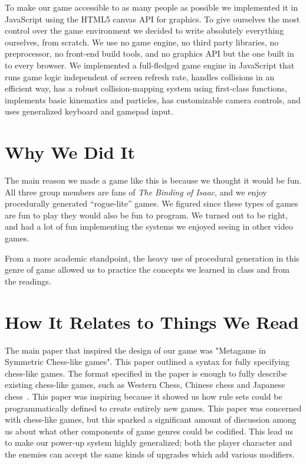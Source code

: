 \documentclass[a4paper, 12pt]{article}
\begin{document}
To make our game accessible to as many people as possible we implemented it in
JavaScript using the HTML5 canvas API for graphics. To give ourselves the most
control over the game environment we decided to write absolutely everything
ourselves, from scratch. We use no game engine, no third party libraries, no
preprocessor, no front-end build tools, and no graphics API but the one built in
to every browser. We implemented a full-fledged game engine in JavaScript that
runs game logic independent of screen refresh rate, handles collisions in an
efficient way, has a robust collision-mapping system using first-class
functions, implements basic kinematics and particles, has customizable camera
controls, and uses generalized keyboard and gamepad input.

\section{Why We Did It}

The main reason we made a game like this is because we thought it would be fun.
All three group members are fans of \textit{The Binding of Isaac}, and we enjoy
procedurally generated ``rogue-lite'' games. We figured since these types of
games are fun to play they would also be fun to program. We turned out to be
right, and had a lot of fun implementing the systems we enjoyed seeing in other
video games.

From a more academic standpoint, the heavy use of procedural generation in this
genre of game allowed us to practice the concepts we learned in class and from
the readings.

\section{How It Relates to Things We Read}

The main paper that inspired the design of our game was "Metagame in Symmetric
Chess-like games". This paper outlined a syntax for fully specifying chess-like
games. The format specified in the paper is enough to fully describe existing
chess-like games, such as Western Chess, Chinese chess and Japanese
chess~\autocite{pell1992}. This paper was inspiring because it showed us how
rule sets could be programmatically defined to create entirely new games. This
paper was concerned with chess-like games, but this sparked a significant amount
of discussion among us about what other components of game genres could be
codified. This lead us to make our power-up system highly generalized; both the
player character and the enemies can accept the same kinds of upgrades which add
various modifiers.
\end{document}
